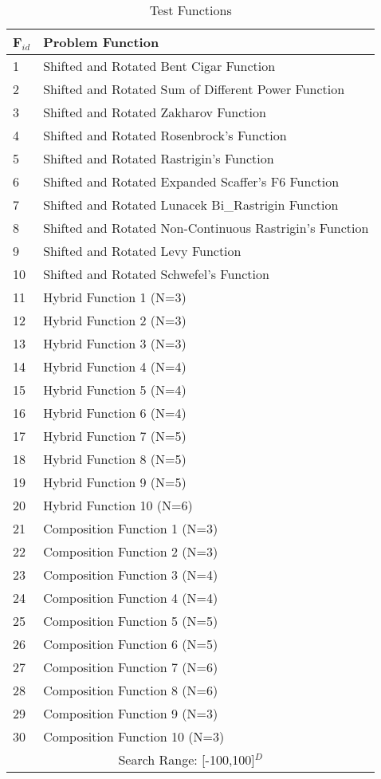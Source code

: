 \begin{table}[!htbp]
\caption{Test Functions}
\vspace{-3mm}
\centering
\begin{tabular}{|p{0.7cm}|p{5.4cm}|}
\hline
F$_{id}$ & Problem Function \\ \hline
1 & Shifted and Rotated Bent Cigar Function \\
\hline
2 & Shifted and Rotated Sum of Different Power Function \\
\hline
3 & Shifted and Rotated Zakharov Function \\
\hline
4 & Shifted and Rotated Rosenbrock’s Function \\
\hline
5 & Shifted and Rotated Rastrigin’s Function \\
\hline
6 & Shifted and Rotated Expanded Scaffer’s F6 Function \\
\hline
7 & Shifted and Rotated Lunacek Bi\_Rastrigin Function \\
\hline
8 & Shifted and Rotated Non-Continuous Rastrigin’s Function \\
\hline
9 & Shifted and Rotated Levy Function \\
\hline
10 & Shifted and Rotated Schwefel’s Function \\
\hline
11 & Hybrid Function 1 (N=3) \\
\hline
12 & Hybrid Function 2 (N=3) \\
\hline
13 & Hybrid Function 3 (N=3) \\
\hline
14 & Hybrid Function 4 (N=4) \\
\hline
15 & Hybrid Function 5 (N=4) \\
\hline
16 & Hybrid Function 6 (N=4) \\
\hline
17 & Hybrid Function 7 (N=5) \\
\hline
18 & Hybrid Function 8 (N=5) \\
\hline
19 & Hybrid Function 9 (N=5) \\
\hline
20 & Hybrid Function 10 (N=6) \\
\hline
21 & Composition Function 1 (N=3) \\
\hline
22 & Composition Function 2 (N=3) \\
\hline
23 & Composition Function 3 (N=4) \\
\hline
24 & Composition Function 4 (N=4) \\
\hline
25 & Composition Function 5 (N=5) \\
\hline
26 & Composition Function 6 (N=5) \\
\hline
27 & Composition Function 7 (N=6) \\
\hline
28 & Composition Function 8 (N=6)  \\
\hline
29 & Composition Function 9 (N=3)  \\
\hline
30 & Composition Function 10 (N=3) \\
\hline
\multicolumn{2}{|c|}{Search Range: [-100,100]$^{D}$ }  \\
\hline
\end{tabular}
\vspace{-5mm}
\end{table}

